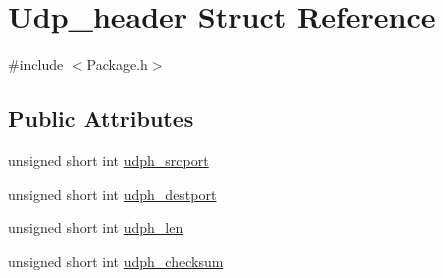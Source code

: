 \hypertarget{structUdp__header}{\section{Udp\-\_\-header Struct Reference}
\label{structUdp__header}
}


{\ttfamily \#include $<$Package.\-h$>$}

\subsection*{Public Attributes}
\begin{DoxyCompactItemize}
\item 
unsigned short int \hyperlink{structUdp__header_aa00a58023dd2a55db5b6e10d1a20a2a6}{udph\-\_\-srcport}
\item 
unsigned short int \hyperlink{structUdp__header_a4468a6ca345200bb93d91ceb4e1a7843}{udph\-\_\-destport}
\item 
unsigned short int \hyperlink{structUdp__header_aeff8dcbd93248830320fb64d5d056ae1}{udph\-\_\-len}
\item 
unsigned short int \hyperlink{structUdp__header_a7df7310126d017145fccb980dccd8752}{udph\-\_\-checksum}
\end{DoxyCompactItemize}


